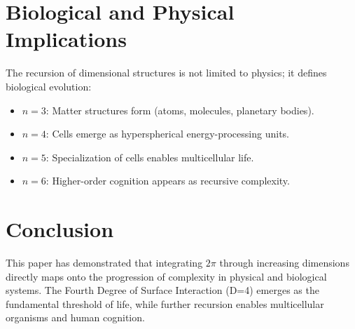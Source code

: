 \documentclass{article}
\begin{document}
\section{Biological and Physical Implications}
The recursion of dimensional structures is not limited to physics; it defines biological evolution:
\begin{itemize}
    \item $n=3$: Matter structures form (atoms, molecules, planetary bodies).
    \item $n=4$: Cells emerge as hyperspherical energy-processing units.
    \item $n=5$: Specialization of cells enables multicellular life.
    \item $n=6$: Higher-order cognition appears as recursive complexity.
\end{itemize}

\section{Conclusion}
This paper has demonstrated that integrating $2\pi$ through increasing dimensions directly maps onto the progression of complexity in physical and biological systems. The Fourth Degree of Surface Interaction (D=4) emerges as the fundamental threshold of life, while further recursion enables multicellular organisms and human cognition.
\end{document}
